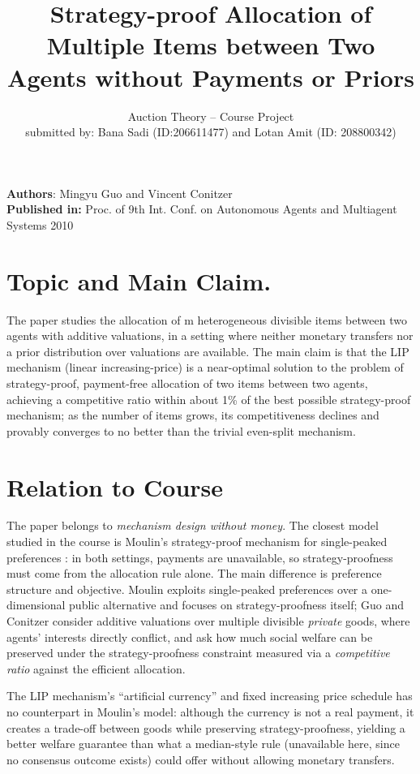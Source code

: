 \documentclass{article}
\title{\vspace{-5ex} Strategy-proof Allocation of Multiple Items between Two
Agents without Payments or Priors}
\author{
Auction Theory -- Course Project \\ submitted by: Bana Sadi (ID:206611477) and Lotan Amit (ID: 208800342)
}%
\date{\vspace{-5ex}}
\begin{document}
\maketitle
\noindent

\textbf{Authors}: Mingyu Guo and Vincent Conitzer \\

\textbf{Published in:} Proc. of
9th Int. Conf. on Autonomous Agents and Multiagent Systems 2010

\section{Topic and Main Claim.}

The paper studies the allocation of m heterogeneous divisible items between two agents with additive valuations, in a setting where neither monetary transfers nor a prior distribution over valuations are available. The main claim is that the LIP mechanism (linear increasing-price) is a near-optimal solution to the problem of strategy-proof, payment-free allocation of two items between two agents, achieving a competitive ratio within about 1\% of the best possible strategy-proof mechanism; as the number of items grows, its competitiveness declines and provably converges to no better than the trivial even-split mechanism.

\section{Relation to Course}
The paper belongs to \emph{mechanism design without money}. The closest model
studied in the course is Moulin's strategy-proof mechanism for single-peaked
preferences \cite{moulin}: in both settings, payments are unavailable, so
strategy-proofness must come from the allocation rule alone. The main
difference is preference structure and objective. Moulin exploits
single-peaked preferences over a one-dimensional public alternative and
focuses on strategy-proofness itself; Guo and Conitzer consider additive
valuations over multiple divisible \emph{private} goods, where agents'
interests directly conflict, and ask how much social welfare can be
preserved under the strategy-proofness constraint measured via a
\emph{competitive ratio} against the efficient allocation.

The LIP mechanism's ``artificial currency'' and fixed increasing price
schedule has no counterpart in Moulin's model: although the currency is not
a real payment, it creates a trade-off between goods while preserving
strategy-proofness, yielding a better welfare guarantee than what a
median-style rule (unavailable here, since no consensus outcome exists) could
offer without allowing monetary transfers.
\end{document}
